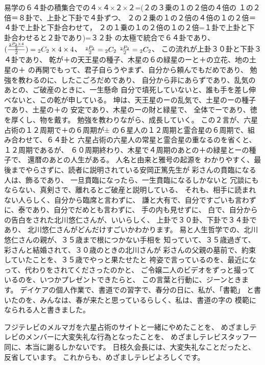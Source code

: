 \documentclass{jsarticle}
\begin{document}
\title{}
\author{}
\date{}
\maketitle
 
  易学の６４卦の積集合での４×４×２×２=(２の３乗の１の２倍の４倍の
  １の２倍＝８卦で、上卦と下卦で４卦ずつ、
  ２の２乗の１の２倍の４倍の１の２倍＝４卦で上卦と下卦合わせて，
  ２の１乗の１の２倍の１の２倍=１卦で上卦と下卦合わせると２卦であり)=３２卦
  の太極で統合で６４卦であり、${({{{{{{}_2P_2} \times 4} \over 2}}\over 2})}
  = {}_2C_2 \times 4 \times 4 $、
  $ {{{{}_2P_2} \over 2}} = {}_2C_2 $ $ {{}_2P_2 \over 2}= {}_2C_2 $、
  この流れが上卦３０卦と下卦３４卦であり、
  乾が＋の天王星の種子、木星の６の緑星のーと＋の立花、地の土星の＋
  の再開でもって、君子自らうやまず、自分から頼んでもだめであり、
  勉強を教わるのに、したこごろだめであり、
  自分から非にあらずであり、乱気のあとの、ご破産のときに、一生懸命
  自分で墳死していないと、誰も手を差し伸べないと、この乾が申している。
  坤は、天王星のーの乱気で、土星のーの種子であり、土星の＋の
  安定であり、木星のーの財と緑星で、
  全体でーであり、徳を厚くし、物を戴す。
  勉強を教わりながら、成長していく。
  この２言が、六星占術の１２周期で＋の６周期が±
  の６星人の１２周期と霊合星の６周期で、組み合わせて、６４卦と
  六星占術の六星人の常星と霊合星の重なるのを省くと、１２周期であるが、
  ６０周期終わり、木星で４周期のあとの＋の緑星とーの種子で、
  還暦のあとの人生がある。
  人名と由来と雅号の起源を
  わかりやすく、最後までやらさずに、読者に説明されている安岡正篤先生が
  彩さんの賁臨になる人は、飾るであり、
  一旦賁臨になったら、一生賁臨になるしかないと
  冗談にもならない、真剣さで、離れるとご破産と説明している、
  それも、相手に読まれない人らしく、自分から臨席と言わずに、
  謙と大有で、自分ですごいも言わずに、泰であり、自分でだめとも言わずに、
  手の内も見せずに、
  白で、自分からの告白をされた北川悠仁さんが、いいらしく、
  上卦で３０卦、下卦で３４卦であり、
  北川悠仁さんがどんだけすごいかわかります。
  易と人生哲学での、北川悠仁さんの親が、３５歳まで根につかない手相を
  知っていて、３５歳過ぎて、彩さんと結婚されて、３０歳のときの北川さんが
  彩さんの父親の墓前で、約束していたことを、３５歳でやっと果たせたと
  袴姿で言っているのを、最近になって、代わりをされてくださったのかと、
  ご令嬢二人のビデオをずっと撮っているのを、いつかプレゼントできたらと、
  この言葉と行動に、ジーンときます。
  デイケアの個人作業で、書道での習字で、春分の日に、私が、「書範」
  と書いたのを、みんなは、春が来たと思っているらしく、私は、書道の字の
  模範になられる人と書きました。
  　


     フジテレビのメルマガを六星占術のサイトと一緒にやめたことを、
  めざましテレビのメンバーに大変失礼な行為となったことを、
  めざましテレビスタッフ一同に、本当に謝るしかないです。
  日枝久会長には、大変失礼なことだったと、反省しています。
  これからも、めざましテレビよろしくです。 
\end{document}
